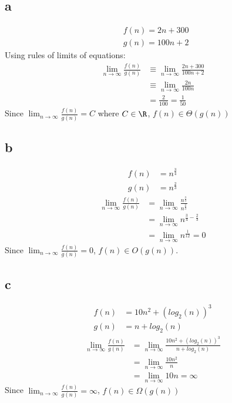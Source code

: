\subsection*{a}
\begin{align*}
    &f(n)= 2n+300\\
    &g(n) =100 n + 2 
\end{align*}
Using rules of limits of equations:
\begin{align*}
    \lim_{n \to \infty}\frac{f(n)}{g(n)} &\equiv \lim_{n \to \infty}\frac{2n + 300}{100n + 2}\\
    &\equiv \lim_{n \to \infty} \frac{2n}{100n}\\
    &=  \frac{2}{100} =\frac{1}{50}
\end{align*}
Since $\lim_{n \to \infty} \frac{f(n)}{g(n)} = C $ where $C \in \R$, $f(n) \in \Theta(g(n))$

\subsection*{b}
\begin{align*}
    f(n) &= n^{\frac{3}{4}}\\
    g(n) &= n^{\frac{2}{3}}
\end{align*}
\begin{align*}
    \lim_{n \to \infty} \frac{f(n)}{g(n)} &= \lim_{n \to \infty} \frac{n^{\frac{3}{4}}}{n^{\frac{2}{3}}}\\
    &= \lim_{n \to \infty} n^{\frac{3}{4} - \frac{2}{3}}\\
    &= \lim_{n \to \infty} n^{\frac{1}{12}} = 0
\end{align*}
Since $\lim_{n \to \infty} \frac{f(n)}{g(n)} = 0 $, $f(n) \in O(g(n))$.

\subsection*{c}
\begin{align*}
    f(n) &= 10n^2 + (log_2(n))^3\\
    g(n) &= n + log_2(n)
\end{align*}
\begin{align*}
    \lim_{n \to \infty} \frac{f(n)}{g(n)} &= \lim_{n \to \infty} \frac{10n^2 + (log_2(n))^3}{n + log_2(n)}\\
    &= \lim_{n \to \infty} \frac{10n^2}{n}\\
    &= \lim_{n \to \infty} 10n = \infty
\end{align*}
Since $\lim_{n \to \infty} \frac{f(n)}{g(n)} = \infty$, $f(n) \in \Omega(g(n))$

